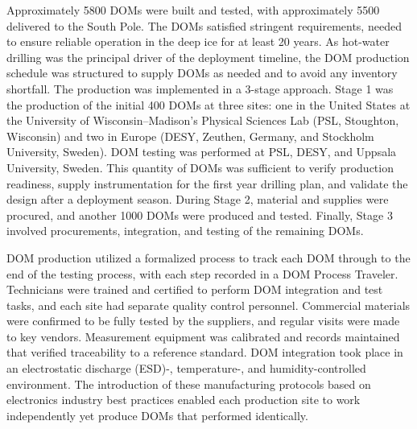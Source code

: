 Approximately 5800 DOMs were built and tested, with
approximately 5500 delivered to the South Pole. The DOMs satisfied
stringent requirements, needed to ensure reliable operation in the deep ice
for at least 20 years. As hot-water drilling was the principal 
driver of the deployment timeline, the DOM production schedule was
structured to supply DOMs as needed and to avoid any inventory shortfall.
The production was implemented in a 3-stage approach. Stage 1 was
the production of the initial 400 DOMs at three sites: one in the
United States at the University of Wisconsin--Madison's Physical
Sciences Lab (PSL, Stoughton, Wisconsin) and two
in Europe (DESY, Zeuthen, Germany, and Stockholm University,
Sweden). DOM testing was performed at PSL, DESY, and Uppsala University,
Sweden. This
quantity of DOMs was sufficient to verify production readiness, supply
instrumentation for the first year drilling plan, and validate the design after a deployment
season.  During Stage 2, material and supplies were procured, and another
1000 DOMs were produced and tested. Finally, Stage 3 involved procurements,
integration, and testing of the remaining DOMs.

DOM production utilized a formalized process to track each DOM through to
the end of the testing process, with each step recorded in a DOM Process
Traveler.  Technicians were trained and certified to perform DOM
integration and test tasks, and each site had separate quality control
personnel. Commercial materials were confirmed to be fully tested by the
suppliers, and regular visits were made to key vendors.  Measurement
equipment was calibrated and records maintained that verified
traceability to a reference standard.  DOM integration took place in
an electrostatic discharge (ESD)-, temperature-, and humidity-controlled environment.  The introduction
of these manufacturing protocols based on electronics industry best
practices enabled each production site to work independently yet
produce DOMs that performed identically.

